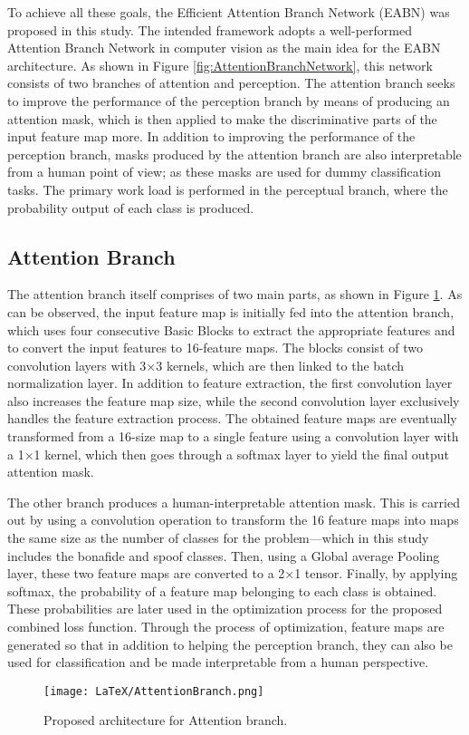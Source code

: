 \documentclass[a4paper]{article}
\begin{document}
To achieve all these goals, the Efficient Attention Branch Network (EABN) was proposed in this study. The intended framework adopts a well-performed Attention Branch Network \cite{25fukui2019attention} in computer vision as the main idea for the EABN architecture. As shown in Figure \ref{fig:AttentionBranchNetwork}, this network consists of two branches of attention and perception. The attention branch seeks to improve the performance of the perception branch by means of producing an attention mask, which is then applied to make the discriminative parts of the input feature map more. In addition to improving the performance of the perception branch, masks produced by the attention branch are also interpretable from a human point of view; as these masks are used for dummy classification tasks. The primary work load is performed in the perceptual branch, where the probability output of each class is produced.
\subsection{Attention Branch}
The attention branch itself comprises of two main parts, as shown in Figure \ref{fig:AttentionBranch}. As can be observed, the input feature map is initially fed into the attention branch, which uses four consecutive Basic Blocks to extract the appropriate features and to convert the input features to 16-feature maps. The blocks consist of two convolution layers with 3×3 kernels, which are then linked to the batch normalization layer. In addition to feature extraction, the first convolution layer also increases the feature map size, while the second convolution layer exclusively handles the feature extraction process. The obtained feature maps are eventually transformed from a 16-size map to a single feature using a convolution layer with a 1×1 kernel, which then goes through a softmax layer to yield the final output attention mask.

The other branch produces a human-interpretable attention mask. This is carried out by using a convolution operation to transform the 16 feature maps into maps the same size as the number of classes for the problem—which in this study includes the bonafide and spoof classes. Then, using a Global average Pooling layer, these two feature maps are converted to a 2×1  tensor. Finally, by applying softmax, the probability of a feature map belonging to each class is obtained. These probabilities are later used in the optimization process for the proposed combined loss function. Through the process of optimization, feature maps are generated so that in addition to helping the perception branch, they can also be used for classification and be made interpretable from a human perspective.
\begin{figure}[H]
  \centering
  \texttt{[image: LaTeX/AttentionBranch.png]}
  \caption{Proposed architecture for Attention branch.}
  \label{fig:AttentionBranch}
\end{figure}
\end{document}
